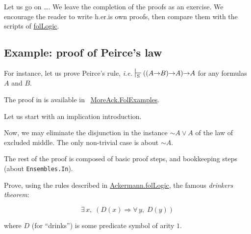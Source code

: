 Let us go on \dots. We leave the completion of the proofs as an exercise. We encourage the reader to write h.er.is own proofs, then compare them with the scripts of \href{../theories/html/hydras.Ackermann.folLogic.html}{folLogic}.







\subsection{Example: proof of Peirce's law}

For instance, let us prove Peirce's rule, \emph{i.e.}
$\sdash ((A \arrow B) \arrow A) \arrow A$ for any formulas $A$ and $B$.

 The proof in \coq is available in  ~\href{../theories/html/hydras.MoreAck.FolExamples.html}{MoreAck.FolExamples}.


Let us start with  an implication introduction.


Now, we may eliminate the disjunction 
in the instance $\sim A \vee A$ of the law of excluded middle.
The only non-trivial case is about $\sim A$.


The rest of the proof is composed of basic proof steps, 
and bookkeeping steps (about \texttt{Ensembles.In}).


\begin{exercise}
Prove, using the rules described in 
 \href{../theories/html/hydras.Ackermann.folLogic.html}{Ackermann.folLogic}, the famous \emph{drinkers theorem}:

$$\exists\,x,\; (D(x)\Longrightarrow \forall\,y,\; D(y))$$
\end{exercise}

where $D$ (for ``drinks'') is some predicate symbol of arity $1$.


